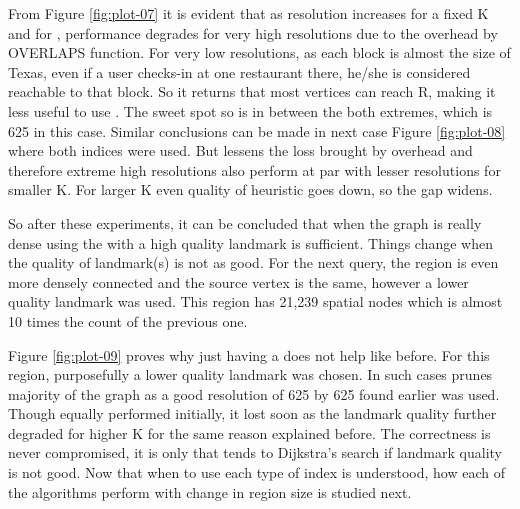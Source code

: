 From Figure \ref{fig:plot-07} it is evident that as resolution increases for a fixed K and for {\rrpspatial}, performance degrades for very high resolutions due to the overhead by OVERLAPS function. For very low resolutions, as each block is almost the size of Texas, even if a user checks-in at one restaurant there, he/she is considered reachable to that block. So it returns that most vertices can reach R, making it less useful to use {\rrpspatial}. The sweet spot so is in between the both extremes, which is 625 in this case. Similar conclusions can be made in next case Figure \ref{fig:plot-08} where both indices were used. But {\rrpsocial} lessens the loss brought by {\rrpspatial} overhead and therefore extreme high resolutions also perform at par with lesser resolutions for smaller K. For larger K even quality of heuristic goes down, so the gap widens.

So after these experiments, it can be concluded that when the graph is really dense using the {\rrpsocial} with a high quality landmark is sufficient. Things change when the quality of landmark(s) is not as good. For the next query, the region is even more densely connected and the source vertex is the same, however a lower quality landmark was used. This region has 21,239 spatial nodes which is almost 10 times the count of the previous one.

Figure \ref{fig:plot-09} proves why just having a {\rrpsocial} does not help like before. For this region, purposefully a lower quality landmark was chosen. In such cases {\rrpspatial} prunes majority of the graph as a good resolution of 625 by 625 found earlier was used. Though {\rrpsocial} equally performed {\rrp} initially, it lost soon as the landmark quality further degraded for higher K for the same reason explained before. The correctness is never compromised, it is only that {\rrp} tends to Dijkstra's search if landmark quality is not good. Now that when to use each type of index is understood, how each of the algorithms perform with change in region size is studied next.

